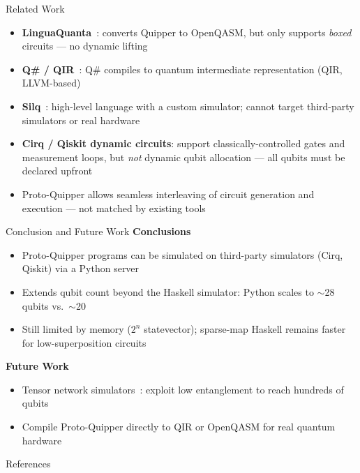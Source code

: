 \documentclass{beamer}
\begin{document}
\begin{frame}{Related Work}
  \small
  \begin{itemize}
    \item \textbf{LinguaQuanta}~\cite{wesley2024linguaquanta}: converts Quipper to OpenQASM, but only supports \emph{boxed} circuits --- no dynamic lifting
    \item \textbf{Q\# / QIR}~\cite{stade2024towards}: Q\# compiles to quantum intermediate representation (QIR, LLVM-based)
    \item \textbf{Silq}~\cite{bichsel2020silq}: high-level language with a custom simulator; cannot target third-party simulators or real hardware
    \item \textbf{Cirq / Qiskit dynamic circuits}: support classically-controlled gates and measurement loops, but \emph{not} dynamic qubit allocation --- all qubits must be declared upfront
    \item Proto-Quipper allows seamless interleaving of circuit generation and execution --- not matched by existing tools
  \end{itemize}
\end{frame}

\begin{frame}{Conclusion and Future Work}
  \textbf{Conclusions}
  \begin{itemize}
    \item Proto-Quipper programs can be simulated on third-party simulators (Cirq, Qiskit) via a Python server
    \item Extends qubit count beyond the Haskell simulator: Python scales to $\sim$28 qubits vs.\ $\sim$20
    \item Still limited by memory ($2^n$ statevector); sparse-map Haskell remains faster for low-superposition circuits
  \end{itemize}
  \vspace{0.1em}
  \textbf{Future Work}
  \begin{itemize}
    \item Tensor network simulators~\cite{berezutskii2025tensor}: exploit low entanglement to reach hundreds of qubits
    \item Compile Proto-Quipper directly to QIR or OpenQASM for real quantum hardware
  \end{itemize}
\end{frame}

\begin{frame}[allowframebreaks]{References}
  \printbibliography[heading=none]
\end{frame}
\end{document}

